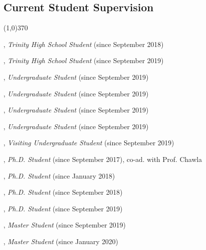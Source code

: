 \documentclass[10pt]{article}
\newenvironment{myindentpar}[1]%
{\begin{list}{}%
         {\setlength{\leftmargin}{#1}}%
         \item[]%
}
{\end{list}}
\newcounter{list}
\begin{document}
\subsection{\sc Current Student Supervision}
\vspace{-0.4cm} \line(1,0){370} \vspace{-0.1cm}

\begin{myindentpar}{0.75cm}

\hspace{-0.75cm}{\bf Eric Zhang}, \emph{Trinity High School Student} (since September 2018)

\hspace{-0.75cm}{\bf Michael Florin}, \emph{Trinity High School Student} (since September 2019)

\hspace{-0.75cm}{\bf Xiangyu Dong}, \emph{Undergraduate Student} (since September 2019)

\hspace{-0.75cm}{\bf Chan Hee Song}, \emph{Undergraduate Student} (since September 2019)

\hspace{-0.75cm}{\bf Tianze Zheng}, \emph{Undergraduate Student} (since September 2019)

\hspace{-0.75cm}{\bf Bo Ni}, \emph{Undergraduate Student} (since September 2019)

\hspace{-0.75cm}{\bf Zaitang Li}, \emph{Visiting Undergraduate Student} (since September 2019)

\hspace{-0.75cm}{\bf Daheng Wang}, \emph{Ph.D. Student} (since September 2017), co-ad. with Prof. Chawla

\hspace{-0.75cm}{\bf Qingkai Zeng}, \emph{Ph.D. Student} (since January 2018)

\hspace{-0.75cm}{\bf Tong Zhao}, \emph{Ph.D. Student} (since September 2018)

\hspace{-0.75cm}{\bf Wenhao Yu}, \emph{Ph.D. Student} (since September 2019)

\hspace{-0.75cm}{\bf Jiaming Li}, \emph{Master Student} (since September 2019)

\hspace{-0.75cm}{\bf Bhakti Sharma}, \emph{Master Student} (since January 2020)

\end{myindentpar}
\end{document}
